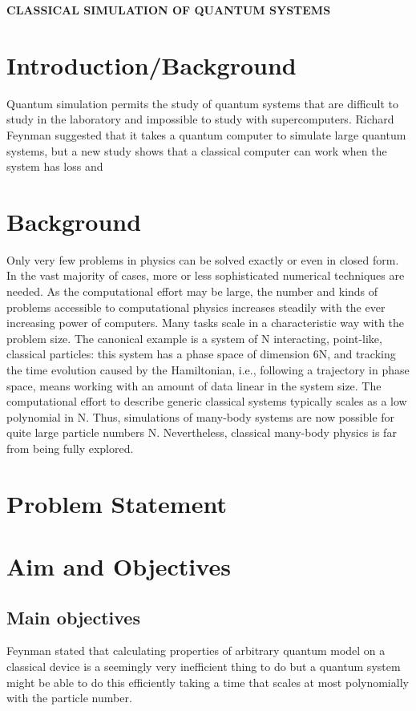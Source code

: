 \documentclass[options]{article}
\begin{document}
\textbf{CLASSICAL SIMULATION OF QUANTUM SYSTEMS}

\section{\textbf{ Introduction/Background}}
Quantum simulation permits the study of quantum systems that are difficult to study in the laboratory and impossible to study with supercomputers.
Richard Feynman suggested that it takes a quantum computer to simulate large quantum systems, but a new study shows that a classical computer can work when the system has loss and 


\section{\textbf{ Background }}
Only very few problems in physics can be solved exactly or even in closed form. In the vast majority of cases, more or less sophisticated numerical techniques are needed. As the computational effort may be large, the number and kinds of problems accessible to computational physics increases steadily with the ever increasing power of computers. Many tasks scale in a characteristic way with the problem size. The canonical example is a system of N interacting, point-like, classical particles: this system has a phase space of dimension 6N, and tracking the time evolution caused by the Hamiltonian, i.e., following a trajectory in phase space, means working with an amount of data linear in the system size. The computational effort to describe generic classical systems typically scales as a low polynomial in N. Thus, simulations of many-body systems are now possible for quite large particle numbers N. Nevertheless, classical many-body physics is far from being fully explored.

\section{\textbf{ Problem Statement}}

\section{\textbf{ Aim and Objectives}}

\subsection{Main objectives}
Feynman stated that calculating properties of arbitrary quantum model on a classical device is a seemingly very inefficient thing to do but a quantum system might be able to do this efficiently taking a time that scales at most polynomially with the particle number.
\end{document}
